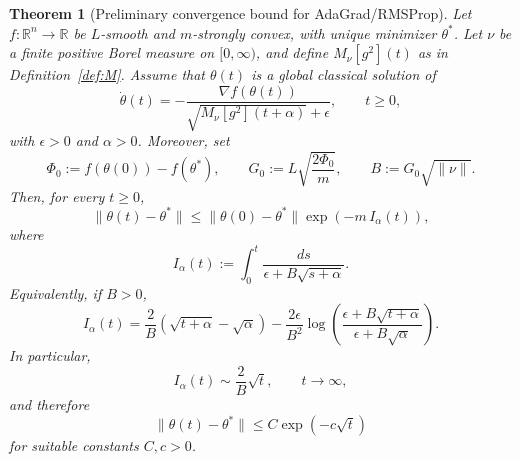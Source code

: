\documentclass{article} %
\newtheorem{theorem}{Theorem}
\begin{document}
\begin{theorem}[Preliminary convergence bound for AdaGrad/RMSProp]
\label{thm:adagrad_rmsprop_memory}
Let \(f:\mathbb R^n\to\mathbb R\) be \(L\)-smooth and \(m\)-strongly convex, with unique minimizer \(\theta^*\). Let \(\nu\) be a finite positive Borel measure on \([0,\infty)\), and define \(M_\nu[g^2](t)\) as in Definition~\ref{def:M}. Assume that \(\theta(t)\) is a global classical solution of
\[
\dot\theta(t)
=
-
\frac{\nabla f(\theta(t))}
{\sqrt{M_\nu[g^2](t+\alpha)}+\epsilon},
\qquad t\ge 0,
\]
with \(\epsilon>0\) and \(\alpha>0\). Moreover, set
\[
\Phi_0:=f(\theta(0))-f(\theta^*),
\qquad
G_0:=L\sqrt{\frac{2\Phi_0}{m}},
\qquad
B:=G_0\sqrt{\|\nu\|}.
\]
Then, for every \(t\ge 0\),
\[
\|\theta(t)-\theta^*\|
\le
\|\theta(0)-\theta^*\|
\exp\!\left(-m\,I_\alpha(t)\right),
\]
where
\[
I_\alpha(t)
:=
\int_0^t
\frac{ds}{\epsilon+B\sqrt{s+\alpha}}.
\]
Equivalently, if \(B>0\),
\[
I_\alpha(t)
=
\frac{2}{B}
\left(\sqrt{t+\alpha}-\sqrt{\alpha}\right)
-
\frac{2\epsilon}{B^2}
\log\!\left(
\frac{\epsilon+B\sqrt{t+\alpha}}
{\epsilon+B\sqrt{\alpha}}
\right).
\]
In particular,
\[
I_\alpha(t)\sim \frac{2}{B}\sqrt t,
\qquad t\to\infty,
\]
and therefore
\begin{equation}\label{th1:bound}
\|\theta(t)-\theta^*\|
\le
C\exp(-c\sqrt t)
\end{equation}
for suitable constants \(C,c>0\).
\end{theorem}
\end{document}
